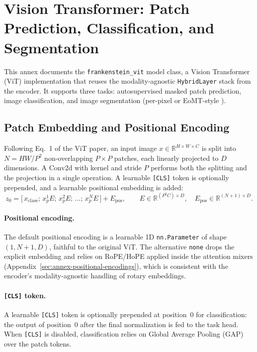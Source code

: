 \section{Vision Transformer: Patch Prediction, Classification, and Segmentation}
\label{sec:annex-vision}

This annex documents the \texttt{frankenstein\_vit} model class, a Vision Transformer (ViT) implementation \citep{dosovitskiy2021vit} that reuses the modality-agnostic \texttt{HybridLayer} stack from the encoder. It supports three tasks: autosupervised masked patch prediction, image classification, and image segmentation (per-pixel or EoMT-style \citep{kerssies2025eomt}).

\subsection{Patch Embedding and Positional Encoding}

Following Eq.~1 of the ViT paper, an input image $x \in \mathbb{R}^{H \times W \times C}$ is split into $N = HW/P^2$ non-overlapping $P \times P$ patches, each linearly projected to $D$ dimensions. A Conv2d with kernel and stride $P$ performs both the splitting and the projection in a single operation. A learnable \texttt{[CLS]} token is optionally prepended, and a learnable positional embedding is added:
\[
z_0 = \big[\,x_\text{class};\, x_p^1 E;\, x_p^2 E;\, \dots;\, x_p^N E\,\big] + E_\text{pos},
\qquad
E \in \mathbb{R}^{(P^2 C) \times D},\quad
E_\text{pos} \in \mathbb{R}^{(N+1) \times D}.
\]

\paragraph{Positional encoding.}
The default positional encoding is a learnable 1D \texttt{nn.Parameter} of shape $(1, N+1, D)$, faithful to the original ViT. The alternative \texttt{none} drops the explicit embedding and relies on RoPE/HoPE applied inside the attention mixers (Appendix~\ref{sec:annex-positional-encodings}), which is consistent with the encoder's modality-agnostic handling of rotary embeddings.

\paragraph{\texttt{[CLS]} token.}
A learnable \texttt{[CLS]} token is optionally prepended at position~$0$ for classification: the output of position~$0$ after the final normalization is fed to the task head. When \texttt{[CLS]} is disabled, classification relies on Global Average Pooling (GAP) over the patch tokens.

